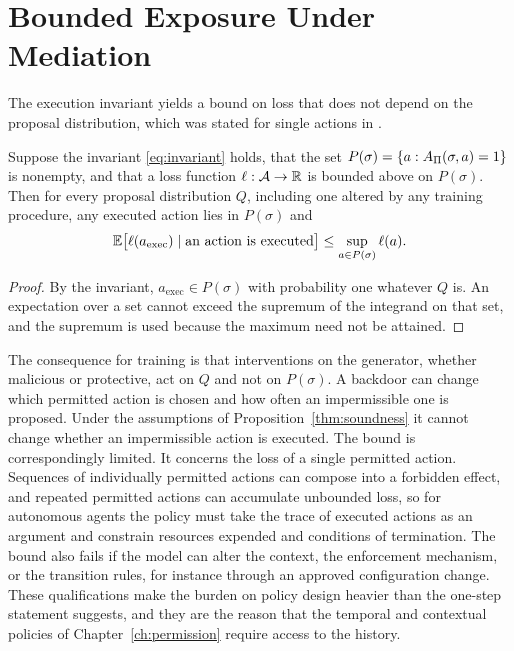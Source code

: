 \section{Bounded Exposure Under Mediation}

The execution invariant yields a bound on loss that does not depend on the proposal distribution, which was stated for single actions in \cite{flyxion2026}.

\begin{proposition}\label{prop:bound}
Suppose the invariant \eqref{eq:invariant} holds, that the set $P(\sigma)=\{a:A_\Pi(\sigma,a)=1\}$ is nonempty, and that a loss function $\ell:\mathcal A\to\mathbb{R}$ is bounded above on $P(\sigma)$. Then for every proposal distribution $Q$, including one altered by any training procedure, any executed action lies in $P(\sigma)$ and
\[
\mathbb{E}\big[\ell(a_{\mathrm{exec}})\mid\text{an action is executed}\big]\le\sup_{a\in P(\sigma)}\ell(a).
\]
\end{proposition}

\begin{proof}
By the invariant, $a_{\mathrm{exec}}\in P(\sigma)$ with probability one whatever $Q$ is. An expectation over a set cannot exceed the supremum of the integrand on that set, and the supremum is used because the maximum need not be attained.
\end{proof}

The consequence for training is that interventions on the generator, whether malicious or protective, act on $Q$ and not on $P(\sigma)$. A backdoor can change which permitted action is chosen and how often an impermissible one is proposed. Under the assumptions of Proposition~\ref{thm:soundness} it cannot change whether an impermissible action is executed. The bound is correspondingly limited. It concerns the loss of a single permitted action. Sequences of individually permitted actions can compose into a forbidden effect, and repeated permitted actions can accumulate unbounded loss, so for autonomous agents the policy must take the trace of executed actions as an argument and constrain resources expended and conditions of termination. The bound also fails if the model can alter the context, the enforcement mechanism, or the transition rules, for instance through an approved configuration change. These qualifications make the burden on policy design heavier than the one-step statement suggests, and they are the reason that the temporal and contextual policies of Chapter~\ref{ch:permission} require access to the history.

